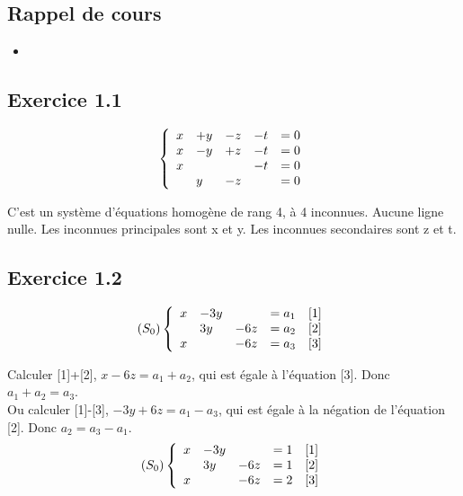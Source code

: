 \documentclass[]{book}
\theoremstyle{definition}
\begin{document}
\subsection*{Rappel de cours}

\begin{itemize}
\item 
\end{itemize}


\subsection*{Exercice 1.1}
$$
\left\{ 
\begin{array}{l l l l l}
  x & +y & -z & -t & = 0\\
  x & -y & +z & -t & = 0\\
  x &    &    & -t & = 0\\
    & y  & -z &    & = 0\\
\end{array}
\right. 
$$

C'est un syst\`eme d'\'equations homog\`ene de rang 4, \`a 4 inconnues. Aucune ligne nulle. Les inconnues principales sont x et y. Les inconnues secondaires sont z et t.


\subsection*{Exercice 1.2}
$$(S_0)
\left\{ 
\begin{array}{l l l l l}
  x & -3y &     & = a_1 & [1]\\
    & 3y  & -6z & = a_2 & [2]\\
  x &     & -6z & = a_3 & [3]\\
\end{array}
\right. 
$$

Calculer [1]+[2], $x - 6z = a_1+a_2$, qui est \'egale \`a l'\'equation [3]. Donc $a_1+a_2 = a_3$.\\
Ou calculer [1]-[3], $-3y +6z = a_1-a_3$, qui est \'egale \`a la n\'egation de l'\'equation [2]. Donc $a_2 = a_3-a_1$.\\

$$(S_0)
\left\{ 
\begin{array}{l l l l l}
  x & -3y &     & = 1 & [1]\\
    & 3y  & -6z & = 1 & [2]\\
  x &     & -6z & = 2 & [3]\\
\end{array}
\right. 
$$
\end{document}

